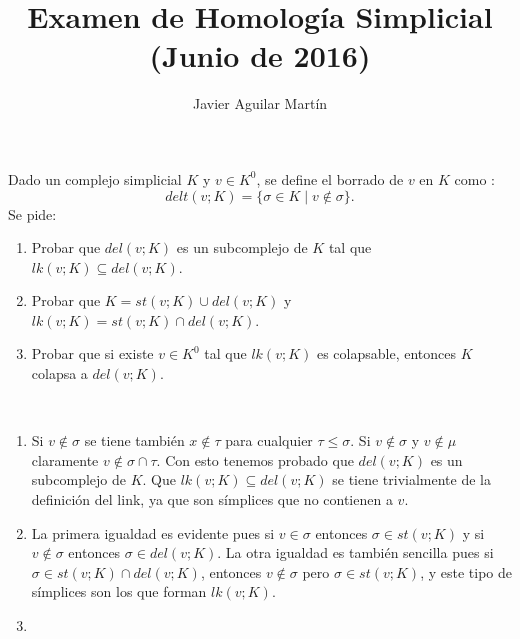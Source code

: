 \documentclass[twoside]{article}
\begin{document}
\title{Examen de Homología Simplicial (Junio de 2016)}
\author{Javier Aguilar Martín}
\maketitle

\begin{ejercicio}{1}
Dado un complejo simplicial $K$ y $v\in K^0$, se define el borrado de $v$ en $K$ como :
\[
delt(v;K)=\{\sigma\in K\mid v\notin\sigma\}.
\]
Se pide:
\begin{enumerate}
\item Probar que $del(v;K)$ es un subcomplejo de $K$ tal que $lk(v;K)\subseteq del(v;K)$.
\item Probar que $K=st(v;K)\cup del(v;K)$ y $lk(v;K)=st(v;K)\cap del(v;K)$.
\item Probar que si existe $v\in K^0$ tal que $lk(v;K)$ es colapsable, entonces $K$ colapsa a $del(v;K)$.
\end{enumerate}
\end{ejercicio}
\begin{solucion}\
\begin{enumerate}
\item Si $v\notin\sigma$ se tiene también $x\notin\tau$ para cualquier $\tau\leq\sigma$. Si $v\notin\sigma$ y $v\notin\mu$ claramente $v\notin \sigma\cap\tau$. Con esto tenemos probado que $del(v;K)$ es un subcomplejo de $K$. Que $lk(v;K)\subseteq del(v;K)$ se tiene trivialmente de la definición del link, ya que son símplices que no contienen a $v$.

\item La primera igualdad es evidente pues si $v\in \sigma$ entonces $\sigma\in st(v;K)$ y si $v\notin\sigma$ entonces $\sigma\in del(v;K)$. La otra igualdad es también sencilla pues si $\sigma\in st(v;K)\cap del(v;K)$, entonces $v\notin \sigma$ pero $\sigma\in st(v;K)$, y este tipo de símplices son los que forman $lk(v;K)$. 

\item 
\end{enumerate}
\end{solucion}

\newpage
\end{document}
